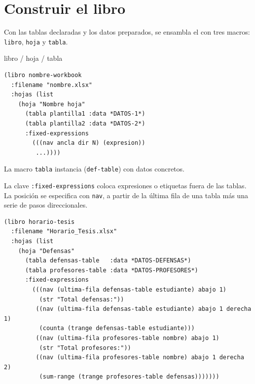 \documentclass[12pt,a4paper]{report}
\begin{document}

\section{Construir el libro}
\label{sec:libro}

Con las tablas declaradas y los datos preparados, se ensambla el 
con tres macros: \texttt{libro}, \texttt{hoja} y \texttt{tabla}.

\begin{sintaxisbox}{libro / hoja / tabla}
\begin{lstlisting}
(libro nombre-workbook
  :filename "nombre.xlsx"
  :hojas (list
    (hoja "Nombre hoja"
      (tabla plantilla1 :data *DATOS-1*)
      (tabla plantilla2 :data *DATOS-2*)
      :fixed-expressions
        (((nav ancla dir N) (expresion))
         ...))))
\end{lstlisting}
\end{sintaxisbox}

La macro \texttt{tabla} instancia  (\texttt{def-table}) con
datos concretos.  

La clave \texttt{:fixed-expressions} coloca expresiones o etiquetas fuera
de las tablas.  La posición se especifica con \texttt{nav},  a partir de la última fila de una tabla más una serie de pasos
direccionales.

\begin{lstlisting}[caption={Workbook completo con totales de pie de tabla.}]
(libro horario-tesis
  :filename "Horario_Tesis.xlsx"
  :hojas (list
    (hoja "Defensas"
      (tabla defensas-table   :data *DATOS-DEFENSAS*)
      (tabla profesores-table :data *DATOS-PROFESORES*)
      :fixed-expressions
        (((nav (ultima-fila defensas-table estudiante) abajo 1)
          (str "Total defensas:"))
         ((nav (ultima-fila defensas-table estudiante) abajo 1 derecha 1)
          (counta (trange defensas-table estudiante)))
         ((nav (ultima-fila profesores-table nombre) abajo 1)
          (str "Total profesores:"))
         ((nav (ultima-fila profesores-table nombre) abajo 1 derecha 2)
          (sum-range (trange profesores-table defensas)))))))
\end{lstlisting}
\end{document}
